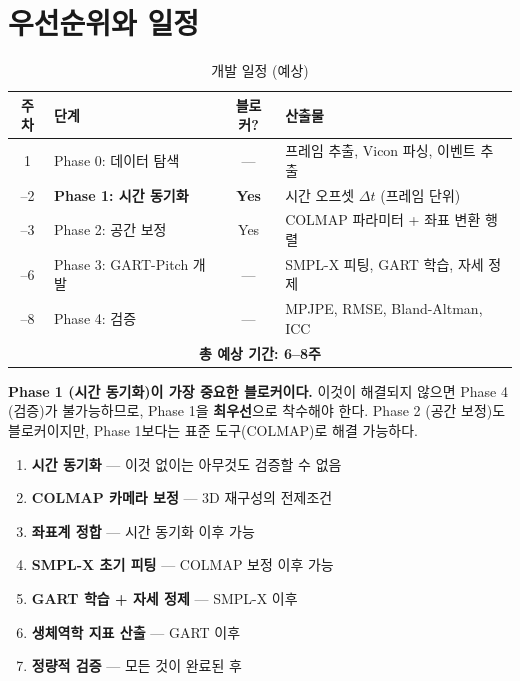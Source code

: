 \documentclass[11pt, a4paper]{report}
\begin{document}
\chapter{우선순위와 일정}
\label{ch:timeline}

\begin{table}[H]
\centering
\caption{개발 일정 (예상)}
\label{tab:timeline}
\renewcommand{\arraystretch}{1.4}
\begin{tabularx}{\textwidth}{clcX}
\toprule
\textbf{주차} & \textbf{단계} & \textbf{블로커?} & \textbf{산출물} \\
\midrule
1 & Phase 0: 데이터 탐색 & --- & 프레임 추출, Vicon 파싱, 이벤트 추출 \\
\addlinespace
1--2 & \textbf{Phase 1: 시간 동기화} & \textbf{Yes} & 시간 오프셋 $\Delta t$ (프레임 단위) \\
\addlinespace
2--3 & Phase 2: 공간 보정 & Yes & COLMAP 파라미터 + 좌표 변환 행렬 \\
\addlinespace
3--6 & Phase 3: GART-Pitch 개발 & --- & SMPL-X 피팅, GART 학습, 자세 정제 \\
\addlinespace
7--8 & Phase 4: 검증 & --- & MPJPE, RMSE, Bland-Altman, ICC \\
\midrule
\multicolumn{4}{c}{\textbf{총 예상 기간: 6--8주}} \\
\bottomrule
\end{tabularx}
\end{table}

\begin{warningbox}
\textbf{Phase 1 (시간 동기화)이 가장 중요한 블로커이다.}
이것이 해결되지 않으면 Phase 4 (검증)가 불가능하므로,
Phase 1을 \textbf{최우선}으로 착수해야 한다.
Phase 2 (공간 보정)도 블로커이지만, Phase 1보다는 표준 도구(COLMAP)로 해결 가능하다.
\end{warningbox}

\begin{summary}[title={실행 우선순위}]
\begin{enumerate}[leftmargin=*]
  \item[\textbf{P0}] \textbf{시간 동기화} --- 이것 없이는 아무것도 검증할 수 없음
  \item[\textbf{P0}] \textbf{COLMAP 카메라 보정} --- 3D 재구성의 전제조건
  \item[\textbf{P1}] \textbf{좌표계 정합} --- 시간 동기화 이후 가능
  \item[\textbf{P1}] \textbf{SMPL-X 초기 피팅} --- COLMAP 보정 이후 가능
  \item[\textbf{P2}] \textbf{GART 학습 + 자세 정제} --- SMPL-X 이후
  \item[\textbf{P2}] \textbf{생체역학 지표 산출} --- GART 이후
  \item[\textbf{P3}] \textbf{정량적 검증} --- 모든 것이 완료된 후
\end{enumerate}
\end{summary}
\end{document}
